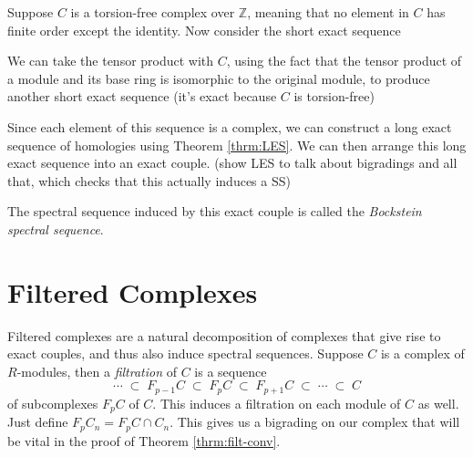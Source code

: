 \documentclass[twoside,10pt]{article}
\begin{document}
\begin{ex}
	Suppose $C$ is a torsion-free complex over $\mathbb{Z}$, meaning that no element in $C$ has finite order except the identity. Now consider the short exact sequence
	\begin{center}
	\end{center}
	We can take the tensor product with $C$, using the fact that the tensor product of a module and its base ring is isomorphic to the original module, to produce another short exact sequence {\color{red}(it's exact because $C$ is torsion-free)}
	\begin{center}
	\end{center}
	Since each element of this sequence is a complex, we can construct a long exact sequence of homologies using Theorem \ref{thrm:LES}. We can then arrange this long exact sequence into an exact couple. {\color{red}(show LES to talk about bigradings and all that, which checks that this actually induces a SS)}
	\begin{center}
	\end{center}
	The spectral sequence induced by this exact couple is called the \textit{Bockstein spectral sequence}.
\end{ex}


\section{Filtered Complexes}

Filtered complexes are a natural decomposition of complexes that give rise to exact couples, and thus also induce spectral sequences. Suppose $C$ is a complex of $R$-modules, then a \textit{filtration} of $C$ is a sequence
\[
\cdots \;\subset\; F_{p-1}C \;\subset\; F_{p}C \;\subset\; F_{p+1}C \;\subset\; \cdots \;\subset\; C
\] 
of subcomplexes $F_{p}C$ of $C$. This induces a filtration on each module of $C$ as well. Just define $F_{p}C_n = F_p C \cap C_n$. This gives us a bigrading on our complex that will be vital in the proof of Theorem \ref{thrm:filt-conv}.
\end{document}
